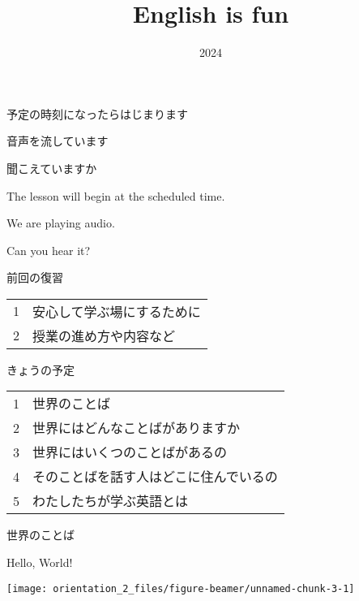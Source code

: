 \documentclass[
  ignorenonframetext,
  aspectratio=169,
  xcolor=dvipsnames]{beamer}
\title{English is fun}
\author{}
\date{\vspace{-2.5em}2024}
\begin{document}
\frame{\titlepage}

\begin{frame}{}
\label{section}
\thispagestyle{empty}
\Large

\raggedright

予定の時刻になったらはじまります

\textbullet  音声を流しています

\textbullet  聞こえていますか　

\vfill

\raggedleft

The lesson will begin at the scheduled time.

\vspace{-6pt}

We are playing audio.

\vspace{-6pt}

Can you hear it?
\end{frame}

\begin{frame}{}
\label{section-1}
\thispagestyle{empty}
\titlepage
\end{frame}

\begin{frame}{前回の復習}
\label{ux524dux56deux306eux5fa9ux7fd2}
\thispagestyle{empty}
\LARGE

\begin{tabular}{rl}
1&安心して学ぶ場にするために\\
2&授業の進め方や内容など
\end{tabular}
\end{frame}

\begin{frame}{きょうの予定}
\label{ux304dux3087ux3046ux306eux4e88ux5b9a}
\thispagestyle{empty}
\Large

\begin{tabular}{rl}
1&世界のことば\\
2&世界にはどんなことばがありますか\\
3&世界にはいくつのことばがあるの\\
4&そのことばを話す人はどこに住んでいるの\\
5&わたしたちが学ぶ英語とは
\end{tabular}
\end{frame}

\begin{frame}{世界のことば}
\label{ux4e16ux754cux306eux3053ux3068ux3070}
\Large

Hello, World!

\texttt{[image: orientation\_2\_files/figure-beamer/unnamed-chunk-3-1]}
\end{frame}
\end{document}
